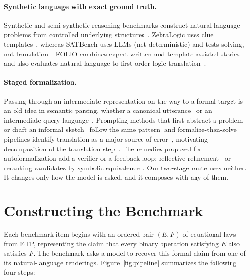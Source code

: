 \documentclass{article}
\begin{document}
\paragraph{Synthetic language with exact ground truth.}
Synthetic and semi-synthetic reasoning benchmarks construct
natural-language problems from controlled underlying
structures~\citep{weston2015babi,sinha2019clutrr,clark2020ruletaker,tafjord2021proofwriter}.
ZebraLogic uses clue templates~\citep{zebralogic2025},
whereas SATBench uses LLMs (not deterministic) and tests solving, not translation~\citep{satbench2025}. FOLIO combines expert-written
and template-assisted stories and also evaluates
natural-language-to-first-order-logic translation~\citep{han2022folio}.
 
\paragraph{Staged formalization.}
Passing through an intermediate representation on the way to a formal target is an old idea in semantic parsing, whether a canonical utterance~\citep{shin2021constrained} or an intermediate query language~\citep{guo2019irnet,gan2021natsql}. Prompting methods that first abstract a problem~\citep{zheng2023stepback} or draft an informal sketch~\citep{jiang2023dsp} follow the same pattern, and formalize-then-solve pipelines identify translation as a major source of error~\citep{olausson2023linc,pan2023logiclm,ye2023satlm,lyu2023faithfulcot}, motivating decomposition of the translation step~\citep{ryu2024divide}. The remedies proposed for autoformalization add a verifier or a feedback loop: reflective refinement~\citep{chen2025reform} or reranking candidates by symbolic equivalence~\citep{li2024symbolic}. Our two-stage route uses neither. It changes only how the model is asked, and it composes with any of them.


\section{Constructing the Benchmark} 
Each benchmark item begins with an ordered pair $(E,F)$ of equational laws
from ETP, representing the claim that every binary operation satisfying $E$
also satisfies $F$. The benchmark asks a model to recover this formal claim
from one of its natural-language renderings. Figure~\ref{fig:pipeline} summarizes the following four
steps:
\end{document}
